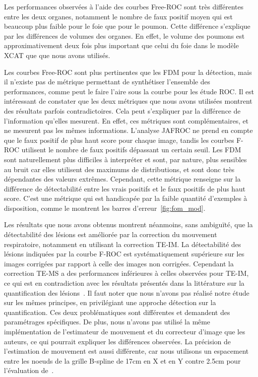 Les performances observées à l'aide des courbes Free-ROC sont très différentes
 entre les deux organes, notamment le nombre de faux positif moyen qui est
beaucoup plus faible pour le foie que pour le poumon. Cette différence
s'explique par les différences de volumes des
organes. En effet, le volume des poumons est approximativement deux fois plus
important que celui du foie dans le modèle XCAT que que nous avons utilisés.

Les courbes Free-ROC sont plus pertinentes que les FDM pour la
détection, mais il n'existe pas de métrique permettant de synthétiser l'ensemble des performances, comme peut le faire l'aire sous la courbe pour les étude ROC. Il est intéressant de constater que les deux métriques que nous
avons utilisées montrent des résultats parfois contradictoires. Cela peut
s'expliquer par la différence de l'information qu'elles mesurent. En effet,
ces métriques sont complémentaires, et ne mesurent pas les mêmes
informations. L'analyse JAFROC
ne prend en compte que le faux positif de plus haut score pour chaque image,
tandis les courbes F-ROC utilisent le nombre de faux positifs dépassant un
certain seuil. Les FDM sont naturellement plus difficiles à interpréter et sont,
par nature, plus sensibles au bruit car elles utilisent des maximums de distributions, et sont
donc très dépendantes des valeurs extrêmes. Cependant, cette métrique renseigne
sur la différence de détectabilité entre les vrais positifs et le
faux positifs de plus haut score. C’est une métrique qui est handicapée par la faible quantité d’exemples à disposition, comme
le montrent les barres d’erreur~\ref{fig:fom_mod}.



Les résultats que nous avons obtenus montrent néanmoins, sans ambiguïté, que
la détectabilité des lésions est améliorée par la correction du mouvement
respiratoire, notamment en utilisant la correction TE-IM. La détectabilité des
lésions indiquées par la courbe F-ROC est systématiquement supérieure sur les
images corrigées par rapport à celle des images non corrigées. Cependant la correction TE-MS a des performances inférieures à celles observées
pour TE-IM, ce qui est en contradiction avec les résultats présentés dans la
littérature sur la quantification des
lésions~\cite{lamare2007list,qiao2006motion}. Il faut noter que nous n'avons pas
réalisé notre
étude sur les mêmes principes, en privilégiant une approche détection sur la
quantification. Ces deux problématiques sont différentes et demandent des
paramétrages spécifiques. De plus, nous n'avons pas utilisé la même
implémentation de l'estimateur de mouvement et du correcteur d'image que
les auteurs, ce qui pourrait expliquer les différences observées. La précision de
l'estimation de mouvement est aussi différente, car nous utilisons un
espacement entre les noeuds de la grille B-spline de 17cm en X et en Y contre 2.5cm pour
l'évaluation de~\cite{lamare2007list}.


